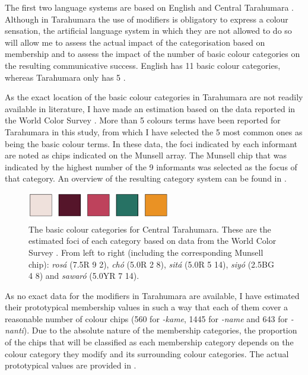The first two language systems are based on English
\citep{sturges95location} and Central Tarahumara
\citep{burgress83tarahumara}. Although in Tarahumara the use of
modifiers is obligatory to express a colour sensation, the artificial
language system in which they are not allowed to do so will allow me
to assess the actual impact of the categorisation based on membership
and to assess the impact of the number of basic colour categories on
the resulting communicative success. English has 11 basic colour
categories, whereas Tarahumara only has 5 \citep{kay08number}.

As the exact location of the basic colour categories in Tarahumara are
not readily available in literature, I have made an estimation
based on the data reported in the World Color Survey
\citep{kay10world}. More than 5 colours terms have been reported for
Tarahumara in this study, from which I have selected the 5 most common
ones as being the basic colour terms. In these data, the foci
indicated by each informant are noted as chips indicated on the
Munsell array. The Munsell chip that was indicated by the highest
number of the 9 informants was selected as the focus of that
category. An overview of the resulting category system can be found in
.

\begin{figure}[htpb]
  \centering
  \includegraphics[height=1.25cm]{./graded-membership/figures/tarahumara-basic-categories.pdf}
  \caption[The basic colour categories for Central Tarahumara]{The
    basic colour categories for Central Tarahumara. These are the
    estimated foci of each category based on data from the World Color
    Survey \citep{kay10world}. From left to right (including the
    corresponding Munsell chip): \textit{ros\'a} (7.5R 9 2), \textit{ch\'o}
    (5.0R 2 8), \textit{sit\'a} (5.0R 5 14), \textit{siy\'o} (2.5BG 4 8) and
    \textit{sawar\'o} (5.0YR 7 14).}
  \label{f:gms-tarahumara-basic}
\end{figure}

As no exact data for the modifiers in Tarahumara are available, I have
estimated their prototypical membership values in such a way that each
of them cover a reasonable number of colour chips (560 for \textit{-kame},
1445 for \textit{-name} and 643 for \textit{-nanti}). Due to the absolute
nature of the membership categories, the proportion of the chips that
will be classified as each membership category depends on the colour
category they modify and its surrounding colour categories. The actual
prototypical values are provided in .

